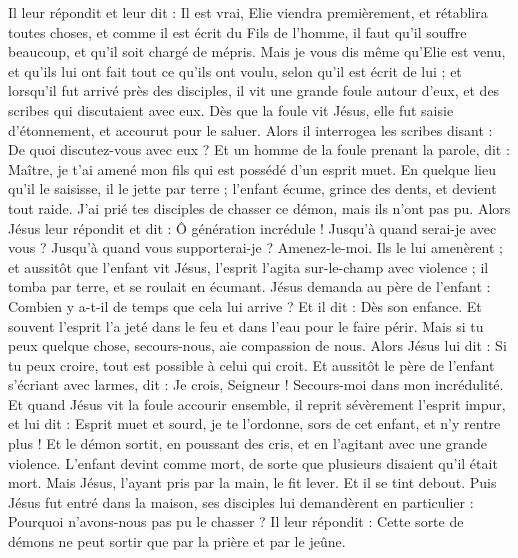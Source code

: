 \begin{multicols}{2}
Il leur répondit et leur dit : Il est vrai, Elie viendra premièrement, et rétablira toutes choses, et comme il est écrit du Fils de l'homme, il faut qu'il souffre beaucoup, et qu'il soit chargé de mépris.
Mais je vous dis même qu'Elie est venu, et qu'ils lui ont fait tout ce qu'ils ont voulu, selon qu'il est écrit de lui ;
et lorsqu'il fut arrivé près des disciples, il vit une grande foule autour d'eux, et des scribes qui discutaient avec eux.
Dès que la foule vit Jésus, elle fut saisie d'étonnement, et accourut pour le saluer.
Alors il interrogea les scribes disant : De quoi discutez-vous avec eux ?
Et un homme de la foule prenant la parole, dit : Maître, je t'ai amené mon fils qui est possédé d'un esprit muet.
En quelque lieu qu'il le saisisse, il le jette par terre ; l'enfant écume, grince des dents, et devient tout raide. J'ai prié tes disciples de chasser ce démon, mais ils n'ont pas pu.
Alors Jésus leur répondit et dit : Ô génération incrédule ! Jusqu'à quand serai-je avec vous ? Jusqu'à quand vous supporterai-je ? Amenez-le-moi. Ils le lui amenèrent  ;
et aussitôt que l'enfant vit Jésus, l'esprit l'agita sur-le-champ avec violence ; il tomba par terre, et se roulait en écumant.
Jésus demanda au père de l'enfant : Combien y a-t-il de temps que cela lui arrive ? Et il dit : Dès son enfance.
Et souvent l'esprit l'a jeté dans le feu et dans l'eau pour le faire périr. Mais si tu peux quelque chose, secours-nous, aie compassion de nous.
Alors Jésus lui dit : Si tu peux croire, tout est possible à celui qui croit.
Et aussitôt le père de l'enfant s'écriant avec larmes, dit : Je crois, Seigneur ! Secours-moi dans mon incrédulité.
Et quand Jésus vit la foule accourir ensemble, il reprit sévèrement l'esprit impur, et lui dit : Esprit muet et sourd, je te l'ordonne, sors de cet enfant, et n'y rentre plus !
Et le démon sortit, en poussant des cris, et en l'agitant avec une grande violence. L'enfant devint comme mort, de sorte que plusieurs disaient qu'il était mort.
Mais Jésus, l'ayant pris par la main, le fit lever. Et il se tint debout.
Puis Jésus fut entré dans la maison, ses disciples lui demandèrent en particulier : Pourquoi n'avons-nous pas pu le chasser ?
Il leur répondit : Cette sorte de démons ne peut sortir que par la prière et par le jeûne.

\end{multicols}
